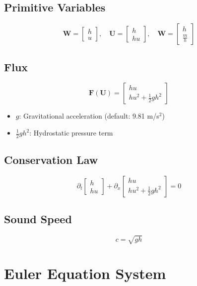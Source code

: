 \documentclass[12pt]{article}
\begin{document}
\subsection{Primitive Variables}
\[
\mathbf{W} = \begin{bmatrix} h \\ u \end{bmatrix}, \quad \mathbf{U} = \begin{bmatrix} h \\ h u \end{bmatrix}, \quad \mathbf{W} = \begin{bmatrix} h \\ \frac{m}{h} \end{bmatrix}
\]

\subsection{Flux}
\[
\mathbf{F}(\mathbf{U}) = \begin{bmatrix} h u \\ h u^2 + \frac{1}{2} g h^2 \end{bmatrix}
\]
\begin{itemize}
    \item $g$: Gravitational acceleration (default: 9.81 m/s$^2$)
    \item $\frac{1}{2} g h^2$: Hydrostatic pressure term
\end{itemize}

\subsection{Conservation Law}
\[
\partial_t \begin{bmatrix} h \\ h u \end{bmatrix} + \partial_x \begin{bmatrix} h u \\ h u^2 + \frac{1}{2} g h^2 \end{bmatrix} = 0
\]

\subsection{Sound Speed}
\[
c = \sqrt{g h}
\]

\section{Euler Equation System}
\end{document}
